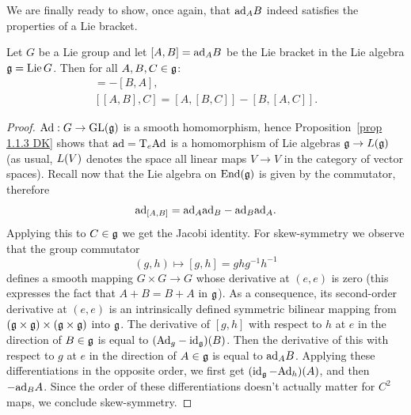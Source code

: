 We are finally ready to show, once again, that $\mathrm{ad}_A B$ indeed satisfies the properties of a Lie bracket.

\begin{thm}
    Let $G$ be a Lie group and let $[A,B]=\mathrm{ad}_A B$ be the Lie bracket in the Lie algebra $\mathfrak{g}=\operatorname{Lie} G$. Then for all $A,B,C\in\mathfrak{g}$:
    \begin{gather}
        [A,B]=-[B,A],\\
        [[A,B],C]=[A,[B,C]]-[B,[A,C]].
    \end{gather}
\end{thm}
\begin{proof}
    $\mathrm{Ad}:G\to \operatorname{GL}(\mathfrak{g})$ is a smooth homomorphism, hence Proposition~\ref{prop 1.1.3 DK} shows that $\mathrm{ad}=\mathrm{T}_e\mathrm{Ad}$ is a homomorphism of Lie algebras $\mathfrak{g}\to \boldsymbol{\mathrm{\mathrm}}{L}(\mathfrak{g})$ (as usual, $\boldsymbol{\mathrm{\mathrm}}{L}(V)$ denotes the space all linear maps $V\to V$ in the category of vector spaces). Recall now that the Lie algebra on $\operatorname{End}(\mathfrak{g})$ is given by the commutator, therefore
    \[\mathrm{ad}_{[A,B]}=\mathrm{ad}_A \mathrm{ad}_B-\mathrm{ad}_B \mathrm{ad}_A.\]
    Applying this to $C\in\mathfrak{g}$ we get the Jacobi identity. For skew-symmetry we observe that the group commutator 
    \[(g,h)\mapsto [g,h]=ghg^{-1}h^{-1}\]
    defines a smooth mapping $G\times G\to G$ whose derivative at $(e,e)$ is zero (this expresses the fact that $A+B=B+A$ in $\mathfrak{g}$). As a consequence, its second-order derivative at $(e,e)$ is an intrinsically defined symmetric bilinear mapping from $(\mathfrak{g}\times\mathfrak{g})\times(\mathfrak{g}\times\mathfrak{g})$ into $\mathfrak{g}$. The derivative of $[g,h]$ with respect to $h$ at $e$ in the direction of $B\in\mathfrak{g}$ is equal to $(\mathrm{Ad}_g-\operatorname{id}_{\mathfrak{g}})(B)$. Then the derivative of this with respect to $g$ at $e$ in the direction of $A\in\mathfrak{g}$ is equal to $\mathrm{ad}_A B$. Applying these differentiations in the opposite order, we first get $(\operatorname{id}_{\mathfrak{g}}-\mathrm{Ad}_h)(A)$, and then $-\mathrm{ad}_B A$. Since the order of these differentiations doesn't actually matter for $C^2$ maps, we conclude skew-symmetry.
\end{proof}



